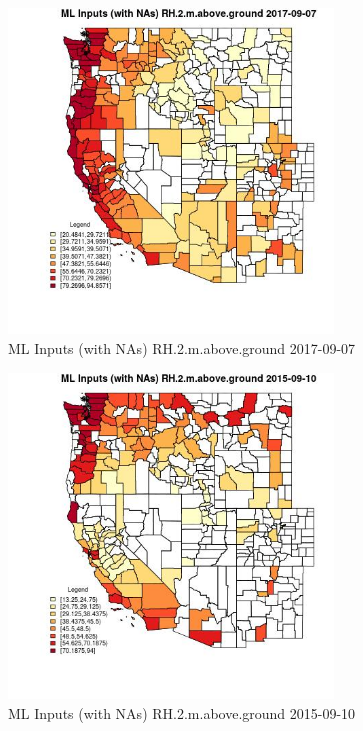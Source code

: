 \begin{figure} 
\centering  
\includegraphics[width=0.77\textwidth]{Code_Outputs/Report_ML_input_PM25_Step4_part_e_de_duplicated_aves_compiled_2019-05-21wNAs_CountyRH2mabovegroundMean2017-09-07.jpg} 
\caption{\label{fig:Report_ML_input_PM25_Step4_part_e_de_duplicated_aves_compiled_2019-05-21wNAsCountyRH2mabovegroundMean2017-09-07}ML Inputs (with NAs) RH.2.m.above.ground 2017-09-07} 
\end{figure} 
 

\begin{figure} 
\centering  
\includegraphics[width=0.77\textwidth]{Code_Outputs/Report_ML_input_PM25_Step4_part_e_de_duplicated_aves_compiled_2019-05-21wNAs_CountyRH2mabovegroundMean2015-09-10.jpg} 
\caption{\label{fig:Report_ML_input_PM25_Step4_part_e_de_duplicated_aves_compiled_2019-05-21wNAsCountyRH2mabovegroundMean2015-09-10}ML Inputs (with NAs) RH.2.m.above.ground 2015-09-10} 
\end{figure} 
 

